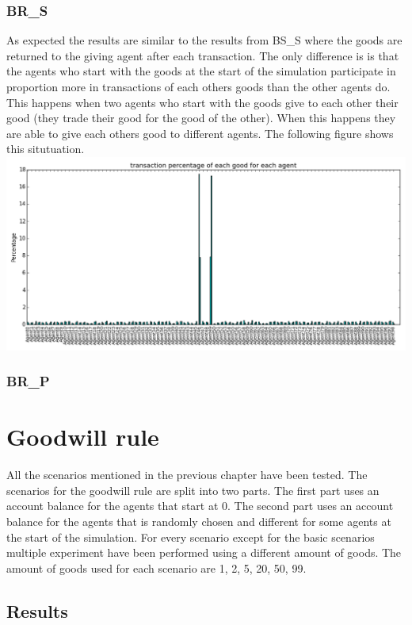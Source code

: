 \documentclass[twoside,openright]{uva-bachelor-thesis}
\begin{document}
\subsubsection{BR\_S}
As expected the results are similar to the results from BS\_S where the goods are returned to the giving agent after each transaction. The only difference is is that the agents who start with the goods at the start of the simulation participate in proportion more in transactions of each others goods than the other agents do. This happens when two agents who start with the goods give to each other their good (they trade their good for the good of the other). When this happens they are able to give each others good to different agents. The following figure shows this situtuation. \\
\includegraphics[scale=0.4]{experiment_images/BR_S}


\subsubsection{BR\_P}


\section{Goodwill rule}
All the scenarios mentioned in the previous chapter have been tested. The scenarios for the goodwill rule are split into two parts. The first part uses an account balance for the agents that start at 0. The second part uses an account balance for the agents that is randomly chosen and different for some agents at the start of the simulation. For every scenario except for the basic scenarios multiple experiment have been performed using a different amount of goods. The amount of goods used for each scenario are 1, 2, 5, 20, 50, 99.
\subsection{Results}
\end{document}
